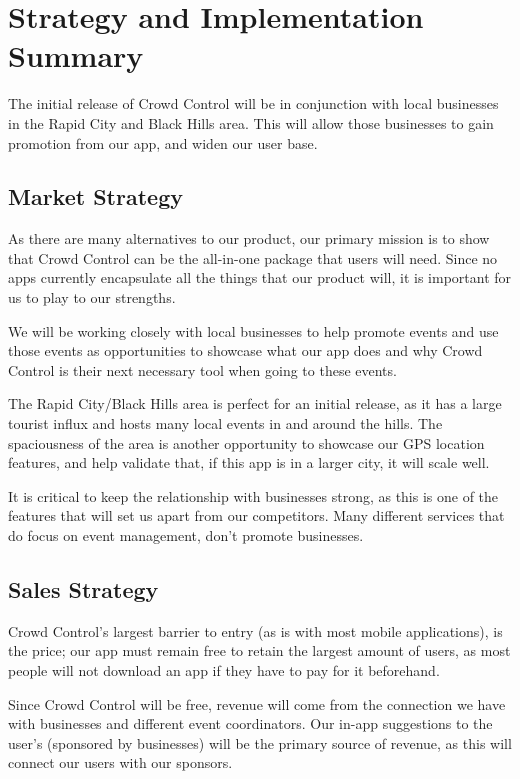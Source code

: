 

\chapter{Strategy and Implementation Summary}

The initial release of Crowd Control will be in conjunction with local businesses in the Rapid City and Black Hills area. This will allow those businesses to gain promotion from our app, and widen our user base.

\section{Market Strategy}
As there are many alternatives to our product, our primary mission is to show that Crowd Control can be the all-in-one package that users will need. Since no apps currently encapsulate all the things that our product will, it is important for us to play to our strengths.

We will be working closely with local businesses to help promote events and use those events as opportunities to showcase what our app does and why Crowd Control is their next necessary tool when going to these events.

The Rapid City/Black Hills area is perfect for an initial release, as it has a large tourist influx and hosts many local events in and around the hills. The spaciousness of the area is another opportunity to showcase our GPS location features, and help validate that, if this app is in a larger city, it will scale well.

It is critical to keep the relationship with businesses strong, as this is one of the features that will set us apart from our competitors. Many different services that do focus on event management, don't promote businesses.

\section{Sales Strategy}

Crowd Control’s largest barrier to entry (as is with most mobile applications), is the price; our app must remain free to retain the largest amount of users, as most people will not download an app if they have to pay for it beforehand.

Since Crowd Control will be free, revenue will come from the connection we have with businesses and different event coordinators. Our in-app suggestions to the user's (sponsored by businesses) will be the primary source of revenue, as this will connect our users with our sponsors.


